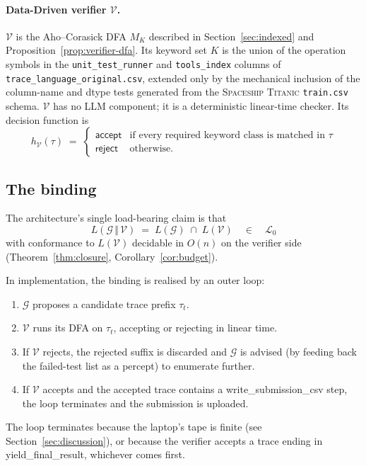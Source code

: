 \paragraph{Data-Driven verifier $\mathcal{V}$.}
$\mathcal{V}$ is the Aho--Corasick DFA $M_K$ described in
Section~\ref{sec:indexed} and Proposition~\ref{prop:verifier-dfa}.
Its keyword set $K$ is the union of the operation symbols in the
\texttt{unit\_test\_runner} and \texttt{tools\_index} columns of
\texttt{trace\_language\_original.csv}, extended only by the
mechanical inclusion of the column-name and dtype tests
generated from the
\textsc{Spaceship Titanic} \texttt{train.csv} schema.
$\mathcal{V}$ has no LLM component; it is a deterministic linear-time
checker.  Its decision function is
\[
h_\mathcal{V}(\tau) \;=\;
\begin{cases}
\mathsf{accept} & \text{if every required keyword class is
matched in } \tau \\
\mathsf{reject} & \text{otherwise.}
\end{cases}
\]

\subsection{The binding}

The architecture's single load-bearing claim is that
\[
L(\mathcal{G}\,\Vert\,\mathcal{V}) \;=\; L(\mathcal{G})\;\cap\;
L(\mathcal{V}) \quad\in\quad \mathcal{L}_0
\]
with conformance to $L(\mathcal{V})$ decidable in $O(n)$ on the verifier side
(Theorem~\ref{thm:closure}, Corollary~\ref{cor:budget}).

In implementation, the binding is realised by an outer loop:
\begin{enumerate}
\item $\mathcal{G}$ proposes a candidate trace prefix $\tau_t$.
\item $\mathcal{V}$ runs its DFA on $\tau_t$, accepting or
rejecting in linear time.
\item If $\mathcal{V}$ rejects, the rejected suffix is discarded
and $\mathcal{G}$ is advised (by feeding back the failed-test
list as a percept) to enumerate further.
\item If $\mathcal{V}$ accepts and the accepted trace contains
a \textsf{write\_submission\_csv} step, the loop terminates and
the submission is uploaded.
\end{enumerate}
The loop terminates because the laptop's tape is finite (see
Section~\ref{sec:discussion}), or because the verifier accepts a
trace ending in \textsf{yield\_final\_result}, whichever comes
first.

